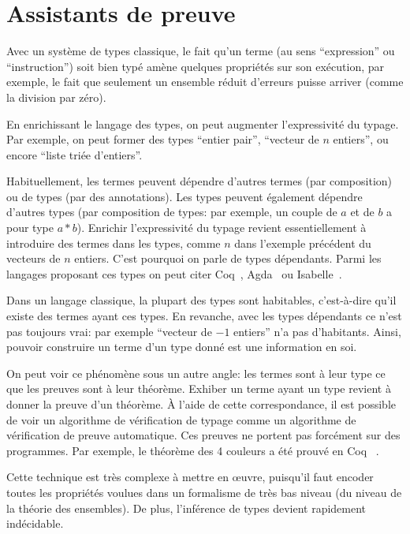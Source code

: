 \section{Assistants de preuve}

Avec un système de types classique, le fait qu'un terme (au sens
\enquote{expression} ou \enquote{instruction}) soit bien typé amène quelques
propriétés sur son exécution, par exemple, le fait que seulement un ensemble
réduit d'erreurs puisse arriver (comme la division par zéro).

En enrichissant le langage des types, on peut augmenter l'expressivité du
typage. Par exemple, on peut former des types \enquote{entier pair},
\enquote{vecteur de $n$ entiers}, ou encore \enquote{liste triée d'entiers}.

Habituellement, les termes peuvent dépendre d'autres termes (par composition) ou
de types (par des annotations). Les types peuvent également dépendre d'autres
types (par composition de types: par exemple, un couple de $a$ et de $b$ a pour
type $a * b$). Enrichir l'expressivité du typage revient essentiellement à
introduire des termes dans les types, comme $n$ dans l'exemple précédent du
vecteurs de $n$ entiers. C'est pourquoi on parle de types dépendants. Parmi les
langages proposant ces types on peut citer Coq~\cite{coqmanual},
Agda~\cite{agdatutorial} ou Isabelle~\cite{isabelletutorial}.

Dans un langage classique, la plupart des types sont habitables, c'est-à-dire
qu'il existe des termes ayant ces types. En revanche, avec les types dépendants
ce n'est pas toujours vrai: par exemple \enquote{vecteur de $-1$ entiers} n'a
pas d'habitants. Ainsi, pouvoir construire un terme d'un type donné est une
information en soi.

On peut voir ce phénomène sous un autre angle: les termes sont à leur type ce
que les preuves sont à leur théorème. Exhiber un terme ayant un type revient à
donner la preuve d'un théorème. À l'aide de cette correspondance, il est
possible de voir un algorithme de vérification de typage comme un algorithme de
vérification de preuve automatique. Ces preuves ne portent pas forcément sur des
programmes. Par exemple, le théorème des 4 couleurs a été prouvé en
Coq~\cite{4colproof} .

Cette technique est très complexe à mettre en œuvre, puisqu'il faut encoder
toutes les propriétés voulues dans un formalisme de très bas niveau (du niveau
de la théorie des ensembles). De plus, l'inférence de types devient rapidement
indécidable.

